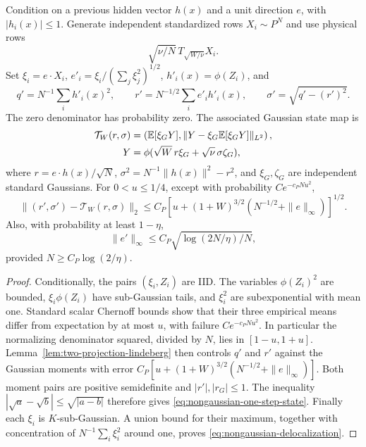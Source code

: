 \begin{lemma}
\label{lem:nongaussian-state-layer}
Condition on a previous hidden vector $h(x)$ and a unit direction $e$,
with $|h_i(x)|\le1$. Generate independent standardized rows
$X_i\sim P^N$ and use physical rows
\[
 \sqrt{\nu/N}\,T_{\sqrt{W/\nu}}X_i.
\]
Set $\xi_i=e\cdot X_i$, $e'_i=\xi_i/(\sum_j\xi_j^2)^{1/2}$,
$h'_i(x)=\phi(Z_i)$, and
\[
 q'=N^{-1}\sum_i h'_i(x)^2,\qquad
 r'=N^{-1/2}\sum_i e'_i h'_i(x),\qquad
 \sigma'=\sqrt{q'-(r')^2}.
\]
The zero denominator has probability zero. The associated Gaussian
state map is
\begin{align}
 \mathcal T_W(r,\sigma)
 &=\left(\mathbb E[\xi_GY],
      \|Y-\xi_G\mathbb E[\xi_GY]\|_{L^2}\right),\notag\\
 Y&=\phi(\sqrt W\,r\xi_G+\sqrt\nu\,\sigma\zeta_G),
 \label{eq:nongaussian-gaussian-state}
\end{align}
where $r=e\cdot h(x)/\sqrt N$, $\sigma^2=N^{-1}\|h(x)\|^2-r^2$,
and $\xi_G,\zeta_G$ are independent standard Gaussians.
For $0<u\le1/4$, except with probability $C e^{-c_PNu^2}$,
\begin{equation}
 \|(r',\sigma')-\mathcal T_W(r,\sigma)\|_2
 \le C_P\left[u+(1+W)^{3/2}
                 (N^{-1/2}+\|e\|_\infty)\right]^{1/2}.
 \label{eq:nongaussian-one-step-state}
\end{equation}
Also, with probability at least $1-\eta$,
\begin{equation}
 \|e'\|_\infty\le C_P\sqrt{\log(2N/\eta)/N},
 \label{eq:nongaussian-delocalization}
\end{equation}
provided $N\ge C_P\log(2/\eta)$.
\end{lemma}
\begin{proof}
Conditionally, the pairs $(\xi_i,Z_i)$ are IID. The variables
$\phi(Z_i)^2$ are bounded, $\xi_i\phi(Z_i)$ have sub-Gaussian tails,
and $\xi_i^2$ are subexponential with mean one. Standard scalar
Chernoff bounds show that their three empirical means differ from
expectation by at most $u$, with failure $C e^{-c_PNu^2}$.
In particular the normalizing denominator squared, divided by $N$,
lies in $[1-u,1+u]$.
Lemma~\ref{lem:two-projection-lindeberg} then controls $q'$ and $r'$
against the Gaussian moments with error
$C_P[u+(1+W)^{3/2}(N^{-1/2}+\|e\|_\infty)]$.
Both moment pairs are positive semidefinite and $|r'|,|r_G|\le1$.
The inequality $|\sqrt a-\sqrt b|\le\sqrt{|a-b|}$ therefore gives
\eqref{eq:nongaussian-one-step-state}.
Finally each $\xi_i$ is $K$-sub-Gaussian. A union bound for their
maximum, together with concentration of $N^{-1}\sum_i\xi_i^2$
around one, proves \eqref{eq:nongaussian-delocalization}.
\end{proof}

